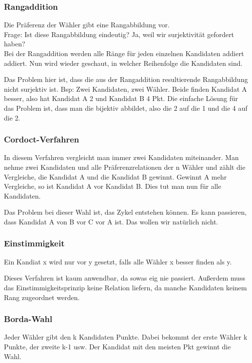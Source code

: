 \documentclass[]{article}
\begin{document}
\subsubsection*{Rangaddition}
Die Präferenz der Wähler gibt eine Rangabbildung vor. \\

Frage: Ist diese Rangabbildung eindeutig? Ja, weil wir surjektivität gefordert haben? \\

Bei der Rangaddition werden alle Ränge für jeden einzelnen Kandidaten addiert addiert. Nun wird wieder geschaut, in welcher Reihenfolge die Kandidaten sind. 

Das Problem hier ist, dass die aus der Rangaddition resultierende Rangabbildung nicht surjektiv ist. Bsp: Zwei Kandidaten, zwei Wähler. Beide finden Kandidat A besser, also hat Kandidat A 2 und Kandidat B 4 Pkt. Die einfache Lösung für das Problem ist, dass man die bijektiv abbildet, also die 2 auf die 1 und die 4 auf die 2. 

\subsubsection*{Cordoct-Verfahren}
 In diesem Verfahren vergleicht man immer zwei Kandidaten miteinander. Man nehme zwei Kandidaten und alle Präferenzrelationen der n Wähler und zählt die Vergleiche, die Kandidat A und die Kandidat B gewinnt. Gewinnt A mehr Vergleiche, so ist Kandidat A vor Kandidat B. Dies tut man nun für alle Kandidaten.
 
 Das Problem bei dieser Wahl ist, das Zykel entstehen können. Es kann passieren, dass Kandidat A von B vor C vor A ist. Das wollen wir natürlich nicht.
 
\subsubsection*{Einstimmigkeit}
 Ein Kandiat x wird nur vor y gesetzt, falls alle Wähler x besser finden als y. 
 
 Dieses Verfahren ist kaum anwendbar, da sowas eig nie passiert. Außerdem muss das Einstimmigkeitsprinzip keine Relation liefern, da manche Kandidaten keinem Rang zugeordnet werden. 
 
\subsubsection*{Borda-Wahl}
Jeder Wähler gibt den k Kandidaten Punkte. Dabei bekommt der erste Wähler k Punkte, der zweite k-1 usw. Der Kandidat mit den meisten Pkt gewinnt die Wahl. \\
\end{document}
